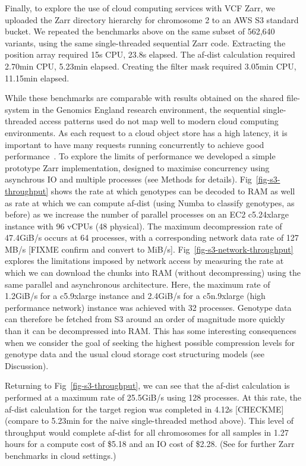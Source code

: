\documentclass[a4paper,num-refs]{oup-contemporary}
\begin{document}
Finally, to explore the use of cloud computing services with VCF Zarr,
we uploaded the Zarr directory hierarchy for chromosome 2 to an AWS S3 
standard bucket. We repeated the benchmarks above on the same subset
of 562,640 variants, using the same 
single-threaded sequential Zarr code.
Extracting the position array required 15s CPU, 23.8s elapsed.
The af-dist calculation required 2.70min CPU, 5.23min elapsed. 
Creating the filter mask
required 3.05min CPU, 11.15min elapsed. 

While these benchmarks are comparable with results obtained on the 
shared file-system in the Genomics England research environment,
the sequential single-threaded access patterns used do not map
well to modern cloud computing environments.
As each request to a cloud object store has a high latency, it 
is important to have many requests running concurrently to achieve 
good performance~\citep{durner2023exploiting}.
To explore the limits of performance we developed a simple prototype
Zarr implementation, designed to maximise concurrency using asynchrous
IO and multiple processes (see Methods for details).
Fig~\ref{fig-s3-throughput} shows the rate at which genotypes 
can be decoded to RAM as well as rate at which we can compute
af-dist (using Numba to classify genotypes, as before)
as we increase the number of parallel processes on
an EC2 c5.24xlarge instance with 96 vCPUs (48 physical).
The maximum decompression rate of 47.4GiB/s 
occurs at 64 processes, with a corresponding 
network data rate of 127 MB/s [FIXME confirm and convert to MiB/s].
Fig~\ref{fig-s3-network-throughput} explores the limitations imposed by
network access by measuring the rate at which we can download the chunks
into RAM (without decompressing) using the same parallel and asynchronous
architecture. Here, the maximum rate of 1.2GiB/s for a c5.9xlarge instance
and 2.4GiB/s for a c5n.9xlarge (high performance network) instance
was achieved with 32 processes. Genotype data can therefore be fetched 
from S3 around an order of magnitude more quickly than it can be decompressed 
into RAM. This has some interesting consequences
when we consider the goal of seeking the highest possible compression levels 
for genotype data and the usual cloud storage cost structuring models (see
Discussion).

Returning to Fig~\ref{fig-s3-throughput}, we can see that the af-dist
calculation is performed at a maximum rate of 25.5GiB/s using 128 
processes. At this rate, the af-dist calculation for the target region 
was completed in 4.12s [CHECKME] (compare to 5.23min for the naive single-threaded
method above).
This level of throughput would complete af-dist for all chromosomes for all samples
in 1.27 hours for a compute cost of \$5.18 and an IO cost of \$2.28.
(See \citep{durbin2020task,moore2021ome,gowan2022using} for further Zarr
benchmarks in cloud settings.)
\end{document}

